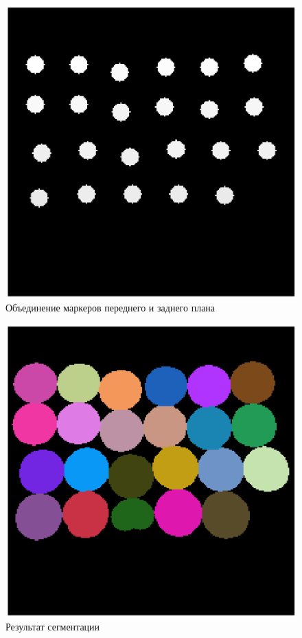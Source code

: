 \begin{figure}[H]
    \includegraphics[width=\textwidth]{../outputs/3_map_local_min.png}
    \caption{Объединение маркеров переднего и заднего плана}
\end{figure}

\begin{figure}[H]
    \includegraphics[width=\textwidth]{../outputs/3_segmentation.png}
    \caption{Результат сегментации}
\end{figure}

